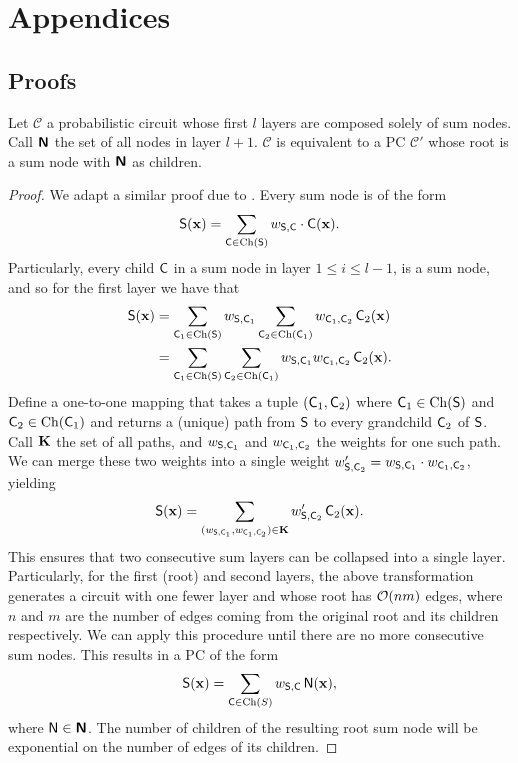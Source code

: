 
\chapter{Appendices}

\section{Proofs}

\begin{theorem}
  \label{thm:summix}
  Let $\mathcal{C}$ a probabilistic circuit whose first $l$ layers are composed solely of sum
  nodes. Call $\Nodes$ the set of all nodes in layer $l+1$. $\mathcal{C}$ is equivalent to a PC
  $\mathcal{C}'$ whose root is a sum node with $\Nodes$ as children.
\end{theorem}
\begin{proof}
  We adapt a similar proof due to \citet{jaini18b}. Every sum node is of the form
  \begin{equation*}
    \Sum(\set{x})=\sum_{\Child\in\Ch(\Sum)}w_{\Sum,\Child}\cdot\Child(\set{x}).
  \end{equation*}
  Particularly, every child $\Child$ in a sum node in layer $1\leq i\leq l-1$, is a sum node, and
  so for the first layer we have that
  \begin{align*}
    \Sum(\set{x})&=\sum_{\Child_1\in\Ch(\Sum)}w_{\Sum,\Child_1}\sum_{\Child_2\in\Ch(\Child_1)}
    w_{\Child_1,\Child_2}\Child_2(\set{x})\\
                 &=\sum_{\Child_1\in\Ch(\Sum)}\sum_{\Child_2\in\Ch(\Child_1)}w_{\Sum,\Child_1}
    w_{\Child_1,\Child_2}\Child_2(\set{x}).
  \end{align*}
  Define a one-to-one mapping that takes a tuple $(\Child_1,\Child_2)$ where $\Child_1\in\Ch(\Sum)$
  and $\Child_2\in\Ch(\Child_1)$ and returns a (unique) path from $\Sum$ to every grandchild
  $\Child_2$ of $\Sum$. Call $\set{K}$ the set of all paths, and $w_{\Sum,\Child_1}$ and
    $w_{\Child_1,\Child_2}$ the weights for one such path. We can merge these two weights into a
  single weight $w_{\Sum,\Child_2}'= w_{\Sum,\Child_1}\cdot w_{\Child_1,\Child_2}$, yielding
  \begin{equation*}
    \Sum(\set{x})=\sum_{(w_{\Sum,\Child_1},w_{\Child_1,\Child_2})\in\set{K}} w_{\Sum,\Child_2}'
    \Child_2(\set{x}).
  \end{equation*}
  This ensures that two consecutive sum layers can be collapsed into a single layer. Particularly,
  for the first (root) and second layers, the above transformation generates a circuit with one
  fewer layer and whose root has $\bigo(nm)$ edges, where $n$ and $m$ are the number of edges coming
  from the original root and its children respectively. We can apply this procedure until there are
  no more consecutive sum nodes. This results in a PC of the form
  \begin{equation*}
    \Sum(\set{x})=\sum_{\Child\in\Ch(S)} w_{\Sum,\Child}\Node(\set{x}),
  \end{equation*}
  where $\Node\in\Nodes$. The number of children of the resulting root sum node will be exponential
  on the number of edges of its children.
\end{proof}

